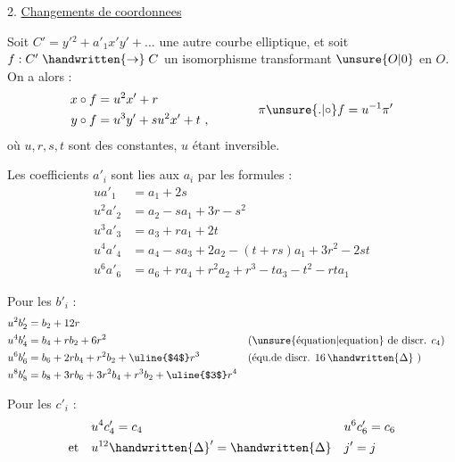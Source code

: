 
2. \uline{Changements de coordonnees}

Soit $C'=y'{}^{2}+a'_{1}x'y'+\ldots$ une autre courbe elliptique, et soit $f:C'\mathrel{\handwritten{\to}}C$ un isomorphisme transformant $\unsure{O|0}$ en $O$. On a alors :
\[
\begin{aligned}
x\circ f&=u^{2}x'+r\\
y\circ f&=u^{3}y'+su^{2}x'+t\ ,
\end{aligned}
\qquad\qquad \pi\unsure{\mathord{.}|\circ}f=u^{-1}\pi'
\]
où $u,r,s,t$ sont des constantes, $u$ étant inversible.

Les coefficients $a'_{i}$ sont lies aux $a_{i}$ par les formules :
\[
\begin{aligned}
ua'_{1}&=a_{1}+2s\\
u^{2}a'_{2}&=a_{2}-sa_{1}+3r-s^{2}\\
u^{3}a'_{3}&=a_{3}+ra_{1}+2t\\
u^{4}a'_{4}&=a_{4}-sa_{3}+2a_{2}-(t+rs)a_{1}+3r^{2}-2st\\
u^{6}a'_{6}&=a_{6}+ra_{4}+r^{2}a_{2}+r^{3}-ta_{3}-t^{2}-rta_{1}
\end{aligned}
\]

Pour les $b'_{i}$ :
\[
\begin{aligned}
u^{2}b'_{2}&=b_{2}+12r\\
u^{4}b'_{4}&=b_{4}+rb_{2}+6r^{2} &&\text{(\unsure{équation|equation} de discr. }c_{4}\text{)}\\
u^{6}b'_{6}&=b_{6}+2rb_{4}+r^{2}b_{2}+\text{\uline{$4$}}r^{3}
    &&\text{(équ.de discr. }16\,\handwritten{\Delta}\text{ )}\\
u^{8}b'_{8}&=b_{8}+3rb_{6}+3r^{2}b_{4}+r^{3}b_{2}+\text{\uline{$3$}}r^{4}
\end{aligned}
\]

Pour les $c'_{i}$ :
\[
\begin{aligned}
 &u^{4}c'_{4}=c_{4}&&u^{6}c'_{6}=c_{6}\\
\text{et}\quad &u^{12}\handwritten{\Delta}'=\handwritten{\Delta}&&j'=j
\end{aligned}
\]

